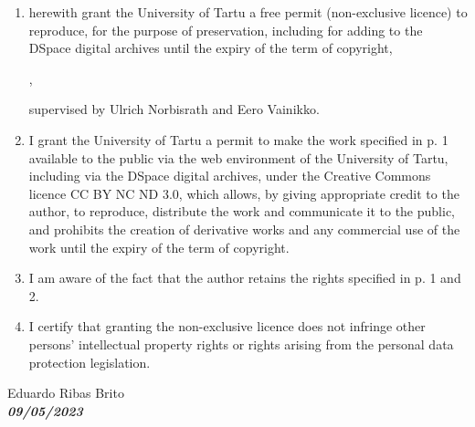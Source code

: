 \begin{enumerate}
\item
herewith grant the University of Tartu a free permit (non-exclusive licence) to
reproduce, for the purpose of preservation, including for adding to the DSpace digital archives until the expiry of the term of copyright,
\par
\textbf{\thesistitle{}}, %
\par
supervised by Ulrich Norbisrath and Eero Vainikko. %
\item
I grant the University of Tartu a permit to make the work specified in p. 1 available to the public via the web environment of the University of Tartu, including via the DSpace digital archives, under the Creative Commons licence CC BY NC ND 3.0, which allows, by giving appropriate credit to the author, to reproduce, distribute the work and communicate it to the public, and prohibits the creation of derivative works and any commercial use of the work until the expiry of the term of copyright.
\item
I am aware of the fact that the author retains the rights specified in p. 1 and 2.
\item
I certify that granting the non-exclusive licence does not infringe other persons' intellectual property rights or rights arising from the personal data protection legislation. 
\end{enumerate}

\noindent
Eduardo Ribas Brito\\ %
\textbf{\textsl{09/05/2023}}
